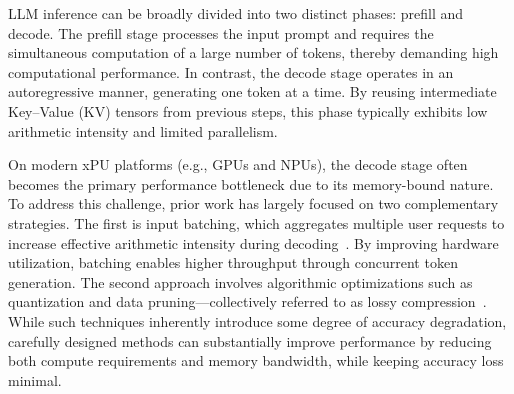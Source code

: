 LLM inference can be broadly divided into two distinct phases: prefill and decode. The prefill stage processes the input prompt and requires the simultaneous computation of a large number of tokens, thereby demanding high computational performance. In contrast, the decode stage operates in an autoregressive manner, generating one token at a time. By reusing intermediate Key–Value (KV) tensors from previous steps, this phase typically exhibits low arithmetic intensity and limited parallelism.

On modern xPU platforms (e.g., GPUs and NPUs), the decode stage often becomes the primary performance bottleneck due to its memory-bound nature. To address this challenge, prior work has largely focused on two complementary strategies. The first is input batching, which aggregates multiple user requests to increase effective arithmetic intensity during decoding~\cite{oaken, attacc, orca, duplex, splitwise}. By improving hardware utilization, batching enables higher throughput through concurrent token generation. The second approach involves algorithmic optimizations such as quantization and data pruning—collectively referred to as lossy compression~\cite{amove, mx+, tender, microscopiq, qserve, duquant}. While such techniques inherently introduce some degree of accuracy degradation, carefully designed methods can substantially improve performance by reducing both compute requirements and memory bandwidth, while keeping accuracy loss minimal.





